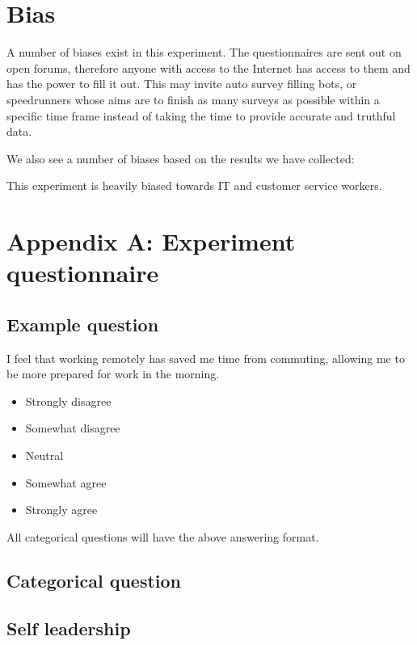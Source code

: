 \documentclass[12pt]{article}
\begin{document}
\section*{Bias}

A number of biases exist in this experiment. The questionnaires are sent out on open forums, therefore anyone with access to the Internet has access to them and has the power to fill it out. This may invite auto survey filling bots, or speedrunners whose aims are to finish as many surveys as possible within a specific time frame instead of taking the time to provide accurate and truthful data.

We also see a number of biases based on the results we have collected:

This experiment is heavily biased towards IT and customer service workers.






\appendix
\section*{Appendix A: Experiment questionnaire}

\subsection*{Example question}
I feel that working remotely has saved me time from commuting, allowing me to be more prepared for work in the morning. 
\begin{itemize}
  \item Strongly disagree
  \item Somewhat disagree
  \item Neutral
  \item Somewhat agree
  \item Strongly agree
\end{itemize}
All categorical questions will have the above answering format.
\subsection*{Categorical question}
\subsection*{Self leadership}
\end{document}
